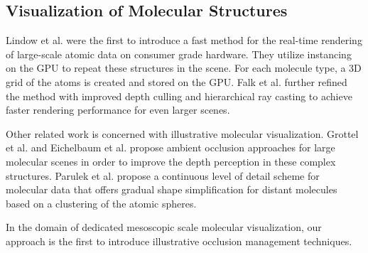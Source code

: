 \subsection{Visualization of Molecular Structures}
Lindow et al. \cite{lindow15} were the first to introduce a fast method for the real-time rendering of large-scale atomic data on consumer grade hardware. They utilize instancing on the GPU to repeat these structures in the scene. For each molecule type, a 3D grid of the atoms is created and stored on the GPU. Falk et al. \cite{falk13} further refined the method with improved depth culling and hierarchical ray casting to achieve faster rendering performance for even larger scenes. 

Other related work is concerned with illustrative molecular visualization. Grottel et al. \cite{grottel12} and Eichelbaum et al. \cite{eichelbaum13} propose ambient occlusion approaches for large molecular scenes in order to improve the depth perception in these complex structures. Parulek et al. \cite{parulek14} propose a continuous level of detail scheme for molecular data that offers gradual shape simplification for distant molecules based on a clustering of the atomic spheres.

In the domain of dedicated mesoscopic scale molecular visualization, our approach is the first to introduce illustrative occlusion management techniques.
